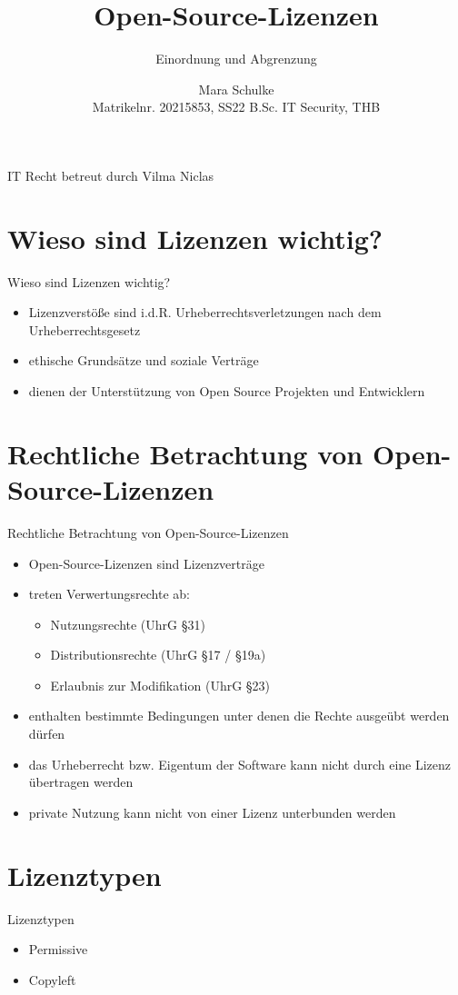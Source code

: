 \documentclass{beamer}
\title{Open-Source-Lizenzen}
\subtitle{Einordnung und Abgrenzung}
\author{Mara Schulke\\\tiny{Matrikelnr. 20215853, SS22 B.Sc. IT Security, THB}}
\begin{document}
\begin{frame}
	IT Recht \hfill betreut durch Vilma Niclas
	\vspace{1em}
	\titlepage
\end{frame}

\section{Wieso sind Lizenzen wichtig?}
\begin{frame}{Wieso sind Lizenzen wichtig?}
	\begin{itemize}
		\item Lizenzverstöße sind i.d.R. Urheberrechtsverletzungen nach dem Urheberrechtsgesetz
		\item ethische Grundsätze und soziale Verträge
		\item dienen der Unterstützung von Open Source Projekten und
			Entwicklern
	\end{itemize}
\end{frame}

\section{Rechtliche Betrachtung von Open-Source-Lizenzen}
\begin{frame}{Rechtliche Betrachtung von Open-Source-Lizenzen}
	\begin{itemize}
		\item Open-Source-Lizenzen sind Lizenzverträge
		\item treten Verwertungsrechte ab:
			\begin{itemize}
				\item Nutzungsrechte (UhrG §31)
				\item Distributionsrechte (UhrG §17 / §19a)
				\item Erlaubnis zur Modifikation (UhrG §23)
			\end{itemize}
		\item enthalten bestimmte Bedingungen unter denen die Rechte ausgeübt
			werden dürfen
		\item das Urheberrecht bzw. Eigentum der Software kann nicht durch eine
			Lizenz übertragen werden
		\item private Nutzung kann nicht von einer Lizenz unterbunden werden
	\end{itemize}
\end{frame}

\section{Lizenztypen}
\begin{frame}{Lizenztypen}
	\begin{itemize}
		\item Permissive
		\item Copyleft
	\end{itemize}
\end{frame}
\end{document}
